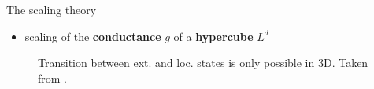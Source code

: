 \documentclass[1pt]{beamer}
\begin{document}
\begin{frame}{The scaling theory  }
\begin{itemize}
\item scaling of the \textbf{conductance} $g$ of 
a \textbf{hypercube} $L^d$ \vspace{3mm} \cite{scaling}
\end{itemize}
\begin{minipage}[c]{0.38\textwidth}
\begin{itemize}
\vspace{5mm} 
\end{itemize}
\end{minipage}\hfill
\begin{minipage}[c]{0.6\textwidth}
\begin{figure}
\caption{Transition between ext. and loc. states is only possible in 3D. Taken from \cite{50yearsof}.}
\end{figure}
\end{minipage}
\end{frame}
\end{document}
